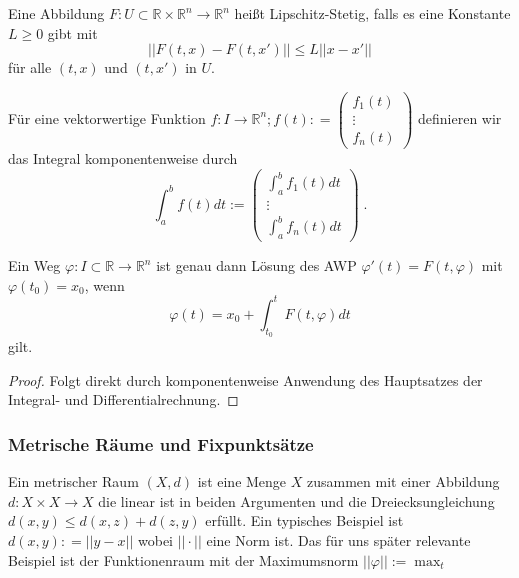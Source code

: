 \begin{Definition}
Eine  Abbildung $F : U \subset \mathbb{R} \times \mathbb{R}^n \to \mathbb{R}^n$ heißt Lipschitz-Stetig,
falls es eine Konstante $L \geq 0$ gibt  mit
$$ || F(t,x) - F(t,x') ||  \leq L || x -x' ||  $$
für alle $(t,x)$ und $(t,x')$ in $U$.
\end{Definition}

\begin{Definition}
Für eine  vektorwertige Funktion  $f : I   \to \mathbb{R}^n; f(t) : = \begin{pmatrix} f_1(t)  \\ \vdots \\ f_n(t) \end{pmatrix}$ definieren wir das Integral komponentenweise durch
$$\int_{a}^{b}  f(t) dt := \begin{pmatrix} \int_{a}^{b}  f_1(t) dt  \\ \vdots \\ \int_{a}^{b}  f_n(t) dt \end{pmatrix} \; .$$
\end{Definition}


\begin{Satz}
Ein Weg $\varphi : I \subset \mathbb{R} \to \mathbb{R}^n$ ist genau dann Lösung des AWP $\varphi'(t) = F(t , \varphi)$ mit $ \varphi(t_0)= x_0$, wenn
$$ \varphi(t) =  x_0 + \int_{t_0}^{t} F(t, \varphi) dt$$
gilt.
\end{Satz}
\begin{proof}
Folgt direkt durch komponentenweise Anwendung des Hauptsatzes der Integral- und Differentialrechnung.
\end{proof}

\subsubsection*{Metrische Räume und Fixpunktsätze} 
Ein metrischer Raum $(X,d)$ ist eine Menge $X$ zusammen mit einer Abbildung $d : X \times X \to X$ die linear ist in beiden Argumenten und die Dreiecksungleichung $d(x,y) \leq d(x,z) + d(z,y)$ erfüllt. Ein typisches Beispiel ist  $d(x,y) : = || y- x ||$  wobei $||  \cdot ||$  eine Norm ist.  Das für uns später relevante Beispiel ist der Funktionenraum mit der Maximumsnorm $|| \varphi || := \max_t$

